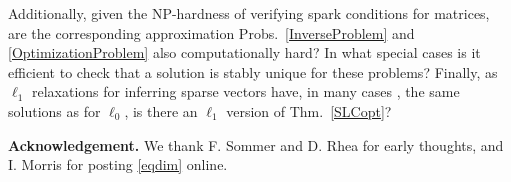 \documentclass[journal, twocolumn]{IEEEtran}
\begin{document}
Additionally, given the NP-hardness of verifying spark conditions for matrices, are the corresponding approximation Probs.~\ref{InverseProblem} and \ref{OptimizationProblem} also computationally hard?  In what special cases is it efficient to check that a solution is stably unique for these problems?  Finally, as $\ell_1$ relaxations for inferring sparse vectors have, in many cases \cite{eldar2012compressed}, the same solutions as for $\ell_0$, is there an $\ell_1$ version of Thm.~\ref{SLCopt}?  %



\textbf{Acknowledgement.} We thank F. Sommer and D. Rhea for early thoughts, and I. Morris for posting \eqref{eqdim} online.
\end{document}
